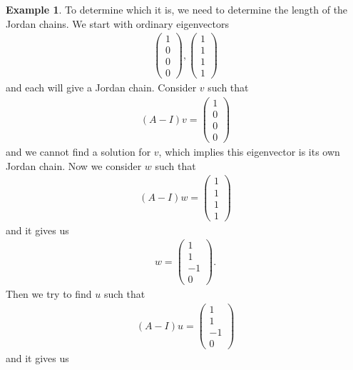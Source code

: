\documentclass[11pt]{book}
\theoremstyle{definition}
\newtheorem{example}{Example}[section]
\numberwithin{equation}{subsection}
\begin{document}
\begin{example}
To determine which it is, we need to determine the length of the Jordan chains. We start with ordinary eigenvectors
\begin{align*}
    \begin{pmatrix}
    1 \\
    0 \\
    0 \\
    0
    \end{pmatrix}, \begin{pmatrix}
    1 \\
    1 \\
    1 \\
    1
    \end{pmatrix}
\end{align*}
and each will give a Jordan chain. Consider $v$ such that
\begin{align*}
    (A - I)v = \begin{pmatrix}
    1 \\
    0 \\
    0 \\
    0
    \end{pmatrix}
\end{align*}
and we cannot find a solution for $v$, which implies this eigenvector is its own Jordan chain. Now we consider $w$ such that
\begin{align*}
    (A - I)w = \begin{pmatrix}
    1 \\
    1 \\
    1 \\
    1
    \end{pmatrix}
\end{align*}
and it gives us 
\begin{align*}
    w = \begin{pmatrix}
    1 \\
    1 \\
    -1 \\
    0
    \end{pmatrix}.
\end{align*}
Then we try to find $u$ such that
\begin{align*}
    (A - I)u = \begin{pmatrix}
    1 \\
    1 \\
    -1 \\
    0
    \end{pmatrix}
\end{align*}
and it gives us
\begin{align*}

\end{align*}
\end{example}
\end{document}
